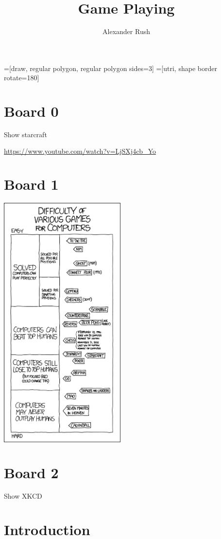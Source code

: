 \documentclass[11pt]{article}
\title{Game Playing}
\author{Alexander Rush}
\date{}
\begin{document}
\MakeScribeTop{}

=[draw, regular polygon, regular polygon sides=3]
=[utri, shape border rotate=180]

\tableofcontents

\section{Board 0}

Show starcraft

\url{https://www.youtube.com/watch?v=LjSXj4cb_Yo}

\section{Board 1}

\begin{center}
  \includegraphics[height=13cm]{../pics/game_ais}
\end{center}

\section{Board 2}


Show XKCD

\section{Introduction}
\end{document}
